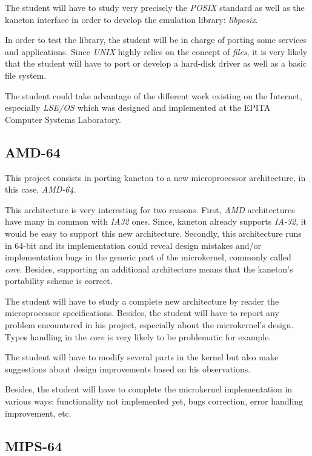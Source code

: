 \begin{multicols}{2}
The student will have to study very precisely the \textit{POSIX} standard
as well as the kaneton interface in order to develop the emulation library:
\textit{libposix}.

In order to test the library, the student will be in charge of porting some
services and applications. Since \textit{UNIX} highly relies on the concept
of \textit{files}, it is very likely that the student will have to port
or develop a hard-disk driver as well as a basic file system.

The student could take advantage of the different work existing on the
Internet, especially \textit{LSE/OS} which was designed and implemented
at the EPITA Computer Systems Laboratory.

%
%

\subsection{AMD-64}

This project consists in porting kaneton to a new microprocessor architecture,
in this case, \textit{AMD-64}.

This architecture is very interesting for two reasons. First, \textit{AMD}
architectures have many in common with \textit{IA32} ones. Since, kaneton
already supports \textit{IA-32}, it would be easy to support this new
architecture. Secondly, this architecture runs in 64-bit and its implementation
could reveal design mistakes and/or implementation bugs in the generic
part of the microkernel, commonly called \textit{core}. Besides, supporting
an additional architecture means that the kaneton's portability scheme
is correct.

The student will have to study a complete new architecture by reader the
microprocessor specifications. Besides, the student will have to report
any problem encountered in his project, especially about the microkernel's
design. Types handling in the \textit{core} is very likely to be problematic
for example.

The student will have to modify several parts in the kernel but also
make suggestions about design improvements based on his observations.

Besides, the student will have to complete the microkernel implementation
in various ways: functionality not implemented yet, bugs correction, error
handling improvement, etc.

%
%

\subsection{MIPS-64}


\end{multicols}

